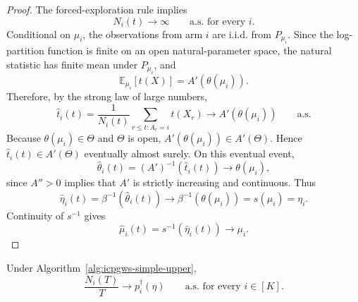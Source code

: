 \documentclass[10pt]{article}
\theoremstyle{plain}
\begin{document}
\begin{proof}
The forced-exploration rule implies
\[
    N_i(t)\to\infty
    \qquad\text{a.s. for every }i.
\]
Conditional on \(\mu_i\), the observations from arm \(i\) are i.i.d. from
\(P_{\mu_i}\).  Since the log-partition function is finite on an open natural-parameter
space, the natural statistic has finite mean under \(P_{\mu_i}\), and
\[
    \mathbb E_{\mu_i}[t(X)]
    =
    A'(\theta(\mu_i)).
\]
Therefore, by the strong law of large numbers,
\[
    \widehat{t}_i(t)
    =
    \frac{1}{N_i(t)}
    \sum_{r\le t:A_r=i}t(X_r)
    \to
    A'(\theta(\mu_i))
    \qquad\text{a.s.}
\]
Because \(\theta(\mu_i)\in\Theta\) and \(\Theta\) is open,
\(A'(\theta(\mu_i))\in A'(\Theta)\).  Hence $\widehat{t}_i(t)\in A'(\Theta)$ eventually almost surely.  On this eventual event,
\[
    \widehat\theta_i(t)
    =
    (A')^{-1}\!\left(\widehat{t}_i(t)\right)
    \to
    \theta(\mu_i),
\]
since \(A''>0\) implies that \(A'\) is strictly increasing and continuous.
Thus
\[
    \widehat \eta_i(t)
    =
    \beta^{-1}(\widehat\theta_i(t))
    \to
    \beta^{-1}(\theta(\mu_i))
    =
    s(\mu_i)
    =
    \eta_i.
\]
Continuity of \(s^{-1}\) gives
\[
    \widehat \mu_i(t)=s^{-1}(\widehat \eta_i(t))\to \mu_i. 
\]

\end{proof}



\begin{lemma}
\label{lem:sampling-proportions-simple-upper}
Under Algorithm~\ref{alg:icpgws-simple-upper},
\[
    \frac{N_i(T)}{T}
    \to
    p_i^\dagger(\eta)
    \qquad\text{a.s. for every }i\in[K].
\]
\end{lemma}
\end{document}
